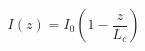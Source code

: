 \begin{equation}
    I(z) = I_0\left(1-\frac{z}{L_c}\right)
\label{eq:kaufman_short_well}
\end{equation}
